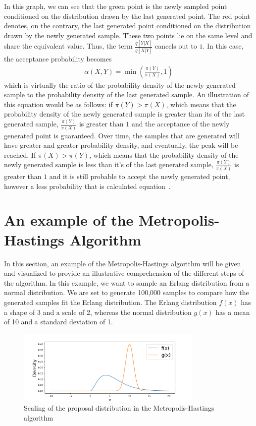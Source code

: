 In this graph, we can see that the green point is the newly sampled point conditioned on the distribution drawn by the last generated point. The red point denotes, on the contrary, the last generated point conditioned on the distribution drawn by the newly generated sample. These two points lie on the same level and share the equivalent value. Thus, the term $\frac{q[Y|X]}{q[X|Y]}$ cancels out to $1$. In this case, the acceptance probability becomes
\begin{align}
\alpha(X, Y) = \min (\frac{\pi(Y)}{\pi(X)}, 1)
\end{align}
which is virtually the ratio of the probability density of the newly generated sample to the probability density of the last generated sample. An illustration of this equation would be as follows: if $\pi(Y) > \pi(X)$, which means that the probability density of the newly generated sample is greater than its of the last generated sample, $\frac{\pi(Y)}{\pi(X)}$ is greater than $1$ and the acceptance of the newly generated point is guaranteed. Over time, the samples that are generated will have greater and greater probability density, and eventually, the peak will be reached. If $\pi(X) > \pi(Y)$, which means that the probability density of the newly generated sample is less than it's of the last generated sample, $\frac{\pi(Y)}{\pi(X)}$ is greater than $1$ and it is still probable to accept the newly generated point, however a less probability that is calculated equation~\cite{understanding_mh}.
\raggedbottom

\section{An example of the Metropolis-Hastings Algorithm}
In this section, an example of the Metropolis-Hastings algorithm will be given and visualized to provide an illustrative comprehension of the different steps of the algorithm. In this example, we want to sample an Erlang distribution from a normal distribution. We are set to generate 100,000 samples to compare how the generated samples fit the Erlang distribution. The Erlang distribution $f(x)$ has a shape of 3 and a scale of 2, whereas the normal distribution $g(x)$ has a mean of 10 and a standard deviation of 1.

\begin{figure}[H]
    \centering
    \includegraphics[width=0.8\textwidth]{figures/mcmc_example/first_step.png}
    \captionsetup{width=.8\textwidth}
    \caption{Scaling of the proposal distribution in the Metropolis-Hastings algorithm}
    \label{fig:enter-label}
\end{figure}


